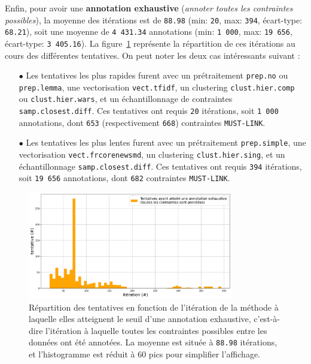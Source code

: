 				
				Enfin, pour avoir une \textbf{annotation exhaustive} (\textit{annoter toutes les contraintes possibles}), la moyenne des itérations est de \texttt{88.98} (min: \texttt{20}, max: \texttt{394}, écart-type: \texttt{68.21}), soit une moyenne de \texttt{4 431.34} annotations (min: \texttt{1 000}, max: \texttt{19 656}, écart-type: \texttt{3 405.16}).
				La figure~\ref{figure:4.1.1-ETUDE-CONVERGENCE-HISTOGRAMME-ANNOTATION-EXHAUSTIVE} représente la répartition de ces itérations au cours des différentes tentatives.
				On peut noter les deux cas intéressants suivant :
				\begin{itemize}
					\item[\(\bullet\)] Les tentatives les plus rapides furent avec un prétraitement \texttt{prep.no} ou \texttt{prep.lemma}, une vectorisation \texttt{vect.tfidf}, un clustering \texttt{clust.hier.comp} ou \texttt{clust.hier.wars}, et un échantillonnage de contraintes \texttt{samp.closest.diff}. Ces tentatives ont requis \texttt{20} itérations, soit \texttt{1 000} annotations, dont \texttt{653} (respectivement \texttt{668}) contraintes \texttt{MUST-LINK}.
					\item[\(\bullet\)] Les tentatives les plus lentes furent avec un prétraitement \texttt{prep.simple}, une vectorisation \texttt{vect.frcorenewsmd}, un clustering \texttt{clust.hier.sing}, et un échantillonnage \texttt{samp.closest.diff}. Ces tentatives ont requis \texttt{394} itérations, soit \texttt{19 656} annotations, dont \texttt{682} contraintes \texttt{MUST-LINK}.
				\end{itemize}
				\begin{figure}[H]
					\centering
					\includegraphics[width=0.8\textwidth]{figures/etude-convergence-histogramme-annotation-exhaustive}
					\caption{Répartition des tentatives en fonction de l'itération de la méthode à laquelle elles atteignent le seuil d'une annotation exhaustive, c'est-à-dire l'itération à laquelle toutes les contraintes possibles entre les données ont été annotées. La moyenne est située à \texttt{88.98} itérations, et l'histogramme est réduit à 60 pics pour simplifier l'affichage.}
					\label{figure:4.1.1-ETUDE-CONVERGENCE-HISTOGRAMME-ANNOTATION-EXHAUSTIVE}
				\end{figure}

